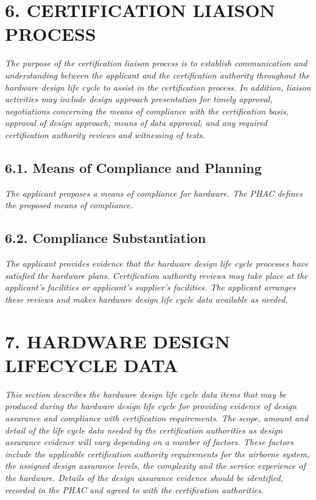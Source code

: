 \documentclass[]{article}
\begin{document}
\section{6. CERTIFICATION LIAISON
PROCESS}\label{certification-liaison-process}

\emph{The purpose of the certification liaison process is to establish
communication and understanding between the applicant and the
certification authority throughout the hardware design life cycle to
assist in the certification process. In addition, liaison activities may
include design approach presentation for timely approval, negotiations
concerning the means of compliance with the certification basis,
approval of design approach, means of data approval, and any required
certification authority reviews and witnessing of tests.}

\subsection{6.1. Means of Compliance and
Planning}\label{means-of-compliance-and-planning}

\emph{The applicant proposes a means of compliance for hardware. The
PHAC defines the proposed means of compliance.}

\subsection{6.2. Compliance
Substantiation}\label{compliance-substantiation}

\emph{The applicant provides evidence that the hardware design life
cycle processes have satisfied the hardware plans. Certification
authority reviews may take place at the applicant's facilities or
applicant's supplier's facilities. The applicant arranges these reviews
and makes hardware design life cycle data available as needed.}

\section{7. HARDWARE DESIGN LIFECYCLE
DATA}\label{hardware-design-lifecycle-data}

\emph{This section describes the hardware design life cycle data items
that may be produced during the hardware design life cycle for providing
evidence of design assurance and compliance with certification
requirements. The scope, amount and detail of the life cycle data needed
by the certification authorities as design assurance evidence will vary
depending on a number of factors. These factors include the applicable
certification authority requirements for the airborne system, the
assigned design assurance levels, the complexity and the service
experience of the hardware. Details of the design assurance evidence
should be identified, recorded in the PHAC and agreed to with the
certification authorities.}
\end{document}
